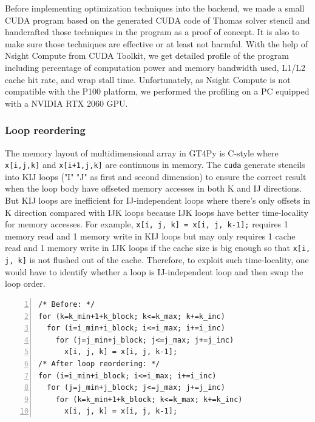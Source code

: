 \documentclass[]{article}
\begin{document}
Before implementing optimization techniques into the backend, we made a small CUDA program based on the generated CUDA code of Thomas solver stencil and handcrafted those techniques in the program as a proof of concept. It is also to make sure those techniques are effective or at least not harmful.
With the help of Nsight Compute from CUDA Toolkit, we get detailed profile of the program including percentage of computation power and memory bandwidth used, L1/L2 cache hit rate, and wrap stall time. Unfortunately, as Nsight Compute is not compatible with the P100 platform, we performed the profiling on a PC equipped with a NVIDIA RTX 2060 GPU.

\subsubsection{Loop reordering}
The memory layout of multidimensional array in GT4Py is C-style where \texttt{x[i,j,k]} and \texttt{x[i+1,j,k]} are continuous in memory. The \texttt{cuda} generate stencils into KIJ loops ("I" "J" as first and second dimension) to ensure the correct result when the loop body have offseted memory accesses in both K and IJ directions. But KIJ loops are inefficient for IJ-independent loops where there's only offsets in K direction compared with IJK loops because IJK loops have better time-locality for memory accesses. For example, \texttt{x[i, j, k] = x[i, j, k-1];} requires 1 memory read and 1 memory write in KIJ loops but may only requires 1 cache read and 1 memory write in IJK loops if the cache size is big enough so that \texttt{x[i, j, k]} is not flushed out of the cache.
Therefore, to exploit such time-locality, one would have to identify whether a loop is IJ-independent loop and then swap the loop order.
\begin{Verbatim}[frame=lines,numbers=left,label=Loop reordering,framesep=3mm]
/* Before: */
for (k=k_min+1+k_block; k<=k_max; k+=k_inc)
  for (i=i_min+i_block; i<=i_max; i+=i_inc)
    for (j=j_min+j_block; j<=j_max; j+=j_inc)
      x[i, j, k] = x[i, j, k-1];
/* After loop reordering: */
for (i=i_min+i_block; i<=i_max; i+=i_inc)
  for (j=j_min+j_block; j<=j_max; j+=j_inc)
    for (k=k_min+1+k_block; k<=k_max; k+=k_inc)
      x[i, j, k] = x[i, j, k-1];
\end{Verbatim}
\end{document}
